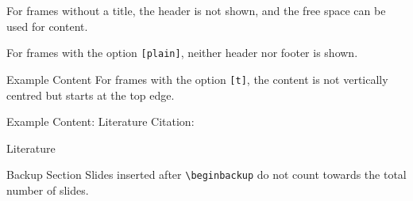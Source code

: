 \documentclass[en]{sdqbeamer}
\begin{document}
\begin{frame}
        For frames without a title, the header is not shown, and
    the free space can be used for content.
\end{frame}

\begin{frame}[plain]
    For frames with the option \texttt{[plain]}, neither header nor footer is shown.
\end{frame}

\begin{frame}[t]{Example Content}
    For frames with the option \texttt{[t]}, the content is not vertically centred but starts at the top edge.
\end{frame}


\begin{frame}{Example Content: Literature}
    Citation: \cite{klare2021jss}
\end{frame}

\appendix
\beginbackup

\begin{frame}{Literature}
\begin{exampleblock}{Backup Section}
    Slides inserted after \texttt{\textbackslash beginbackup} do not count towards the total number of slides.
\end{exampleblock}

\printbibliography
\end{frame}
\end{document}
